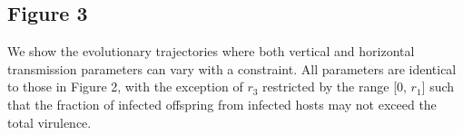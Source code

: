 \subsection{Figure 3}

We show the evolutionary trajectories where both vertical and horizontal
transmission parameters can vary with a constraint. All parameters are identical
to those in Figure 2, with the exception of $r_3$ restricted by the range
[0, $r_1$] such that the fraction of infected offspring from infected hosts
may not exceed the total virulence.

\begin{figure}[tbph]
    \centering
        \hfil
        \\[-2ex]
        \hfil
        \\[-2ex]

\end{figure}
